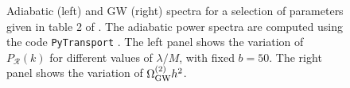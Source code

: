\begin{enumerate}
\begin{figure}[H]
\caption{Adiabatic (left) and GW (right)  spectra for a  selection  of parameters given in table 2 of \cite{Bhattacharya:2022fze}. The adiabatic power spectra are   computed using the code \texttt{PyTransport} \cite{Mulryne:2016mzv}. The left panel shows the variation of $P_{\mathcal{R}}(k)$ for different values of $\lambda /M$, with fixed $b=50$. The right panel shows the variation of $\Omega _{\rm GW}^{(2)}h^2$. 
}
\label{fig:psgw}
\end{figure}

\end{enumerate}



\newpage